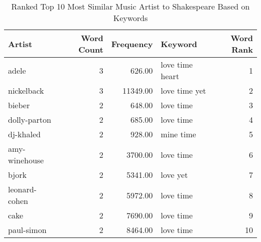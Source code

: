 \begin{table}[ht]
\centering
\begin{tabular}{lrrlr}
  \hline
Artist & Word Count & Frequency & Keyword & Word Rank \\ 
  \hline
adele &   3 & 626.00 &  love time heart &   1 \\ 
  nickelback &   3 & 11349.00 &  love time yet &   2 \\ 
  bieber &   2 & 648.00 &  love time &   3 \\ 
  dolly-parton &   2 & 685.00 &  love time &   4 \\ 
  dj-khaled &   2 & 928.00 &  mine time &   5 \\ 
  amy-winehouse &   2 & 3700.00 &  love time &   6 \\ 
  bjork &   2 & 5341.00 &  love yet &   7 \\ 
  leonard-cohen &   2 & 5972.00 &  love time &   8 \\ 
  cake &   2 & 7690.00 &  love time &   9 \\ 
  paul-simon &   2 & 8464.00 &  love time &  10 \\ 
   \hline
\end{tabular}
\caption{Ranked Top 10 Most Similar Music Artist to Shakespeare Based on Keywords} 
\label{tab:wordranktable}
\end{table}

